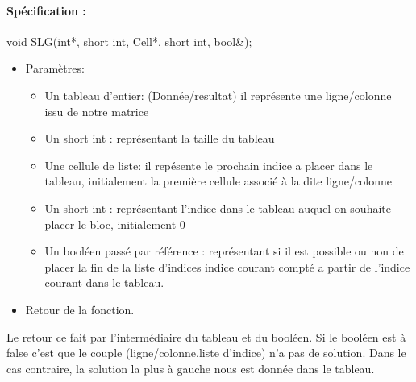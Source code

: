 \documentclass{article}
\begin{document}
\paragraph{Spécification :}
 void SLG(int*, short int, Cell*, short int, bool\&);
\begin{itemize}
\item Paramètres:
\begin{itemize}
\item Un tableau d'entier: (Donnée/resultat) il représente une ligne/colonne issu de notre matrice
\item Un short int : représentant la taille du tableau
\item Une cellule de liste: il repésente le prochain indice a placer dans le tableau, initialement la première cellule associé à la dite ligne/colonne
\item Un short int : représentant l'indice dans le tableau auquel on souhaite placer le bloc, initialement 0
\item Un booléen passé par référence : représentant si il est possible ou non de placer la fin de la liste d'indices indice courant compté a partir de l'indice courant dans le tableau.
\end{itemize}
\item Retour de la fonction.
\end{itemize}
Le retour ce fait par l'intermédiaire du tableau et du booléen. Si le booléen est à false c'est que le couple (ligne/colonne,liste d'indice) n'a pas de solution. Dans le cas contraire, la solution la plus à gauche nous est donnée dans le tableau.
\end{document}
